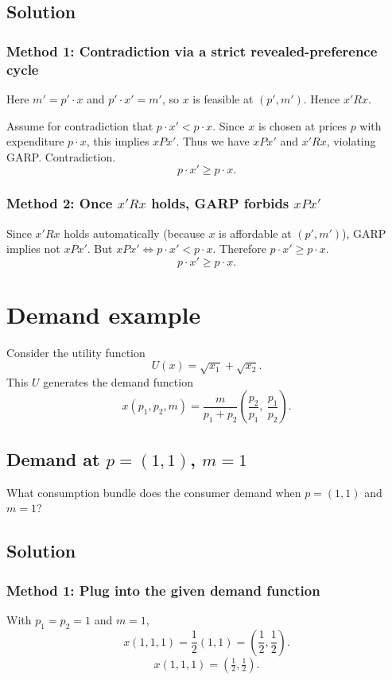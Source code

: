 \documentclass[12pt]{article}
\newcommand{\dotp}{\cdot}
\begin{document}
\subsection*{Solution}
\subsubsection*{Method 1: Contradiction via a strict revealed-preference cycle}
Here \(m'=p'\dotp x\) and \(p'\dotp x'=m'\), so \(x\) is feasible at \((p',m')\). Hence \(x'R x\).

Assume for contradiction that \(p\dotp x'<p\dotp x\). Since \(x\) is chosen at prices \(p\) with expenditure \(p\dotp x\),
this implies \(xP x'\). Thus we have \(xP x'\) and \(x'R x\), violating GARP. Contradiction.
\[
\boxed{p\dotp x'\ge p\dotp x.}
\]

\subsubsection*{Method 2: Once \(x'R x\) holds, GARP forbids \(xP x'\)}
Since \(x'R x\) holds automatically (because \(x\) is affordable at \((p',m')\)), GARP implies not \(xP x'\).
But \(xP x'\iff p\dotp x'<p\dotp x\). Therefore \(p\dotp x'\ge p\dotp x\).
\[
\boxed{p\dotp x'\ge p\dotp x.}
\]

\newpage
\section{Demand example}

Consider the utility function
\[
U(x)=\sqrt{x_1}+\sqrt{x_2}.
\]
This \(U\) generates the demand function
\[
x(p_1,p_2,m)=\frac{m}{p_1+p_2}\left(\frac{p_2}{p_1},\ \frac{p_1}{p_2}\right).
\]

\subsection{Demand at \(p=(1,1)\), \(m=1\)}
What consumption bundle does the consumer demand when \(p=(1,1)\) and \(m=1\)?

\subsection*{Solution}
\subsubsection*{Method 1: Plug into the given demand function}
With \(p_1=p_2=1\) and \(m=1\),
\[
x(1,1,1)=\frac{1}{2}(1,1)=\left(\frac12,\frac12\right).
\]
\[
\boxed{x(1,1,1)=\left(\tfrac12,\tfrac12\right).}
\]
\end{document}
